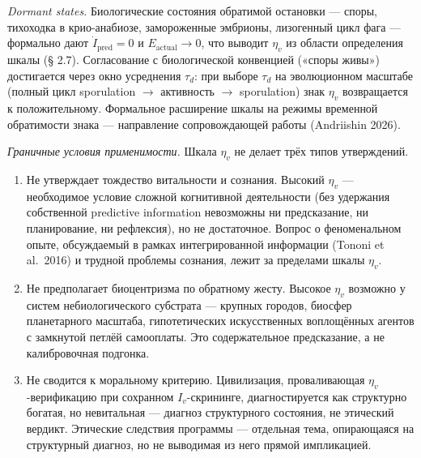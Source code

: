 \documentclass[pdflatex,sn-mathphys-ay]{sn-jnl}
\providecommand{\tightlist}{\setlength{\itemsep}{0pt}\setlength{\parskip}{0pt}}
\begin{document}
\emph{Dormant states.} Биологические состояния обратимой остановки --- споры, тихоходка в крио-анабиозе, замороженные эмбрионы, лизогенный цикл фага --- формально дают \(\dot{I}_{\text{pred}} = 0\) и \(E_{\text{actual}} \to 0\), что выводит \(\eta_v\) из области определения шкалы (§ 2.7). Согласование с биологической конвенцией («споры живы») достигается через окно усреднения \(\tau_d\): при выборе \(\tau_d\) на эволюционном масштабе (полный цикл sporulation \(\to\) активность \(\to\) sporulation) знак \(\eta_v\) возвращается к положительному. Формальное расширение шкалы на режимы временной обратимости знака --- направление сопровождающей работы (Andriishin 2026).

\emph{Граничные условия применимости.} Шкала \(\eta_v\) не делает трёх типов утверждений.

\begin{enumerate}
\def\labelenumi{\arabic{enumi}.}
\tightlist
\item
  Не утверждает тождество витальности и сознания. Высокий \(\eta_v\) --- необходимое условие сложной когнитивной деятельности (без удержания собственной predictive information невозможны ни предсказание, ни планирование, ни рефлексия), но не достаточное. Вопрос о феноменальном опыте, обсуждаемый в рамках интегрированной информации (Tononi et al.~2016) и трудной проблемы сознания, лежит за пределами шкалы \(\eta_v\).
\item
  Не предполагает биоцентризма по обратному жесту. Высокое \(\eta_v\) возможно у систем небиологического субстрата --- крупных городов, биосфер планетарного масштаба, гипотетических искусственных воплощённых агентов с замкнутой петлёй самооплаты. Это содержательное предсказание, а не калибровочная подгонка.
\item
  Не сводится к моральному критерию. Цивилизация, проваливающая \(\eta_v\)-верификацию при сохранном \(I_v\)-скрининге, диагностируется как структурно богатая, но невитальная --- диагноз структурного состояния, не этический вердикт. Этические следствия программы --- отдельная тема, опирающаяся на структурный диагноз, но не выводимая из него прямой импликацией.
\end{enumerate}
\end{document}
